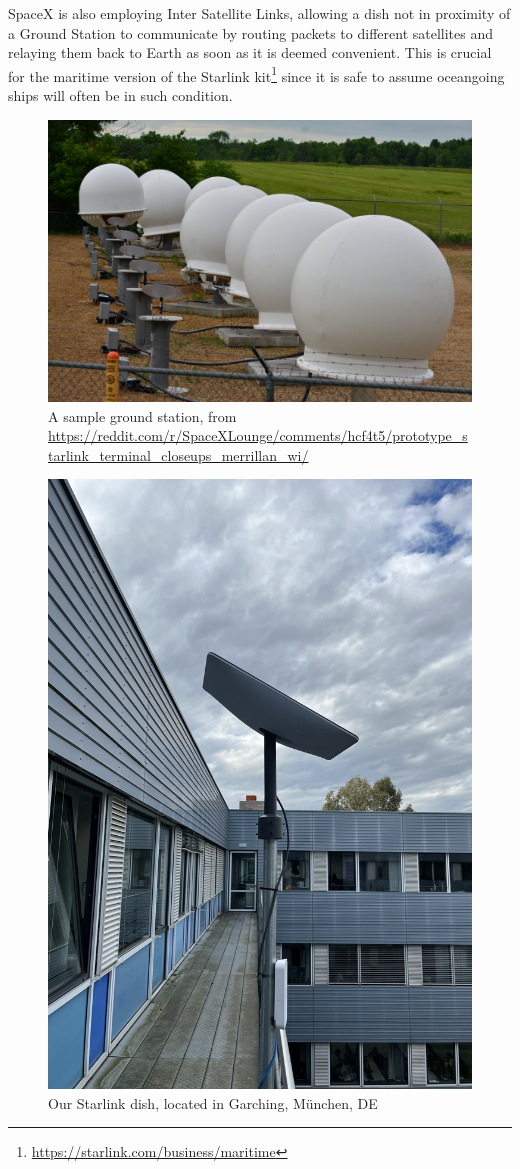 \documentclass[IN,11pt,twoside,openright,idp,english]{tumthesis}
\begin{document}
SpaceX is also employing Inter Satellite Links, allowing a dish not in proximity of a Ground Station to communicate by
routing packets to different satellites and relaying them back to Earth as soon as it is deemed convenient. This is
crucial for the maritime version of the Starlink kit\footnote{\url{https://starlink.com/business/maritime}} since it is
safe to assume oceangoing ships will often be in such condition.
   
\begin{figure}
    \centering
    \includegraphics[width=0.6\columnwidth]{img/ground-station.jpeg}
    \caption{A sample ground station, from \small\protect\url{https://reddit.com/r/SpaceXLounge/comments/hcf4t5/prototype_starlink_terminal_closeups_merrillan_wi/}}
    \label{fig:gs}
\end{figure}
    
\begin{figure}
    \centering
    \includegraphics[width=0.6\columnwidth]{img/dish.jpeg}
    \caption{Our Starlink dish, located in Garching, München, DE}
    \label{fig:dish}
\end{figure}
    
\end{document}

